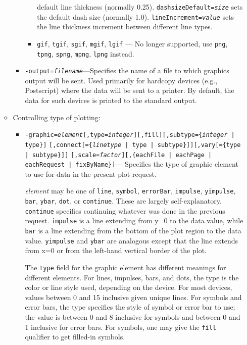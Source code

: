 \begin{itemize}
\begin{itemize}
\begin{itemize}
\begin{itemize}
        default line thickness (normally 0.25).  {\tt dashsizeDefault={\em size}} sets the default dash size
        (normally 1.0).  {\tt lineIncrement={\em value}} sets the line thickness increment between different
        line types.
        \item {\tt gif}, {\tt tgif}, {\tt sgif}, {\tt mgif}, {\tt lgif} --- No longer supported, use {\tt png}, 
        {\tt tpng}, {\tt spng}, {\tt mpng}, {\tt lpng} instead.
        \end{itemize}
  \item {\tt -output={\em filename}}---Specifies the name of a file to which graphics output will be sent.
        Used primarily for hardcopy devices (e.g., Postscript) where the data will be sent to a printer.
        By default, the data for such devices is printed to the standard output.
  \end{itemize}
\item Controlling type of plotting:
  \begin{itemize}

  \item {\tt -graphic={\em element}[,type={\em integer}][,fill][,subtype=\{{\em integer} | type\}]}
        {\tt [,connect[=\{{\em linetype} | type | subtype\}]][,vary[=\{type | subtype\}]]}
        {\tt [,scale={\em factor}][,\{eachFile | eachPage | eachRequest | fixByName\}]}---
        Specifies the type of graphic element to use for data in the present plot request.  

{\em element} may be one of {\tt line}, {\tt symbol}, {\tt errorBar}, {\tt impulse}, {\tt yimpulse}, {\tt
bar}, {\tt ybar}, {\tt dot}, or {\tt continue}.  These are largely self-explanatory.  {\tt continue}
specifies continuing whatever was done in the previous request.  {\tt impulse} is a line extending from
y=0 to the data value, while {\tt bar} is a line extending from the bottom of the plot region to the data
value.  {\tt yimpulse} and {\tt ybar} are analogous except that the line extends from x=0 or from the
left-hand vertical border of the plot.

The {\tt type} field for the graphic element has different meanings for different elements.  For
lines, impulses, bars, and dots, the type is the color or line style used, depending on the device.
For most devices, values between 0 and 15 inclusive given unique lines.  For symbols and error bars,
the type specifies the style of symbol or error bar to use; the value is between 0 and 8 inclusive
for symbols and between 0 and 1 inclusive for error bars.  For symbols, one may give the {\tt fill}
qualifier to get filled-in symbols.


\end{itemize}
\end{itemize}
\end{itemize}

